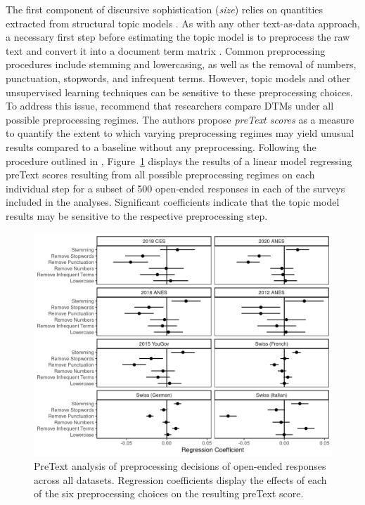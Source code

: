 The first component of discursive sophistication (\textit{size}) relies on quantities extracted from structural topic models \citep{roberts2014structural}. As with any other text-as-data approach, a necessary first step before estimating the topic model is to preprocess the raw text and convert it into a document term matrix \citep[DTM, see for example][]{manning2008introduction}. Common preprocessing procedures include stemming and lowercasing, as well as the removal of numbers, punctuation, stopwords, and infrequent terms. However, topic models and other unsupervised learning techniques can be sensitive to these preprocessing choices. To address this issue, \citet{denny2018text} recommend that researchers compare DTMs under all possible preprocessing regimes. The authors propose \textit{preText scores} as a measure to quantify the extent to which varying preprocessing regimes may yield unusual results compared to a baseline without any preprocessing. Following the procedure outlined in \citet{denny2018text}, Figure~\ref{fig:pretext} displays the results of a linear model regressing preText scores resulting from all possible preprocessing regimes on each individual step for a subset of 500 open-ended responses in each of the surveys included in the analyses. Significant coefficients indicate that the topic model results may be sensitive to the respective preprocessing step.

\begin{figure}[h]
\centering\includegraphics[scale=.9]{../fig/pretext.png}
    \caption[PreText analysis of preprocessing decisions of open-ended responses across all datasets]{PreText analysis of preprocessing decisions of open-ended responses across all datasets. Regression coefficients display the effects of each of the six preprocessing choices on the resulting preText score.}\label{fig:pretext}
\end{figure}


